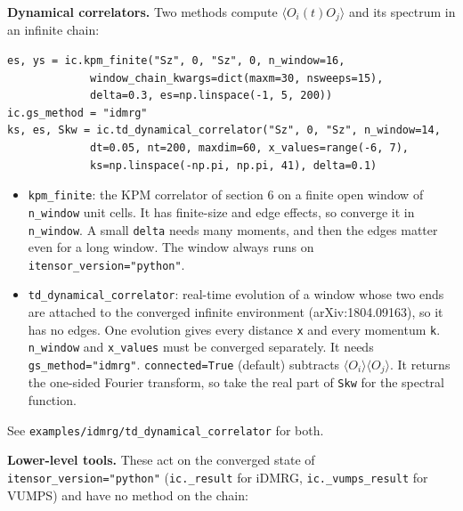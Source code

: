 \documentclass[11pt]{article}
\providecommand{\tightlist}{\setlength{\itemsep}{0pt}\setlength{\parskip}{0pt}}
\begin{document}
\textbf{Dynamical correlators.} Two methods compute
\(\langle O_i(t)O_j\rangle\) and its spectrum in an infinite chain:

\begin{lstlisting}
es, ys = ic.kpm_finite("Sz", 0, "Sz", 0, n_window=16,
             window_chain_kwargs=dict(maxm=30, nsweeps=15),
             delta=0.3, es=np.linspace(-1, 5, 200))
ic.gs_method = "idmrg"
ks, es, Skw = ic.td_dynamical_correlator("Sz", 0, "Sz", n_window=14,
             dt=0.05, nt=200, maxdim=60, x_values=range(-6, 7),
             ks=np.linspace(-np.pi, np.pi, 41), delta=0.1)
\end{lstlisting}

\begin{itemize}
\tightlist
\item
  \texttt{kpm\_\allowbreak{}finite}: the KPM correlator of section 6 on a finite open window of
  \texttt{n\_\allowbreak{}window} unit cells. It has finite-size and edge effects, so converge
  it in \texttt{n\_\allowbreak{}window}. A small \texttt{delta} needs many moments, and then the
  edges matter even for a long window. The window always runs on
  \texttt{itensor\_\allowbreak{}version="python"}.
\item
  \texttt{td\_\allowbreak{}dynamical\_\allowbreak{}correlator}: real-time evolution of a window whose two
  ends are attached to the converged infinite environment
  (arXiv:1804.09163), so it has no edges. One evolution gives every
  distance \texttt{x} and every momentum \texttt{k}. \texttt{n\_\allowbreak{}window} and \texttt{x\_\allowbreak{}values} must be
  converged separately. It needs \texttt{gs\_\allowbreak{}method="idmrg"}. \texttt{connected=True}
  (default) subtracts \(\langle O_i\rangle\langle O_j\rangle\). It returns
  the one-sided Fourier transform, so take the real part of \texttt{Skw} for the
  spectral function.
\end{itemize}

See \texttt{examples/idmrg/td\_\allowbreak{}dynamical\_\allowbreak{}correlator} for both.

\textbf{Lower-level tools.} These act on the converged state of
\texttt{itensor\_\allowbreak{}version="python"} (\texttt{ic.\allowbreak{}\_\allowbreak{}result} for iDMRG, \texttt{ic.\allowbreak{}\_\allowbreak{}vumps\_\allowbreak{}result}
for VUMPS) and have no method on the chain:
\end{document}
